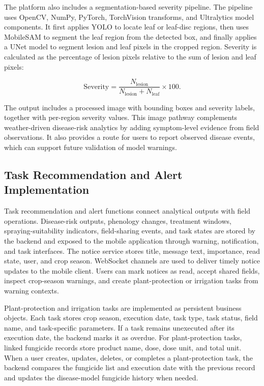 \documentclass[11pt,a4paper]{article}
\begin{document}
The platform also includes a segmentation-based severity pipeline. The pipeline uses OpenCV, NumPy, PyTorch, TorchVision transforms, and Ultralytics model components. It first applies YOLO to locate leaf or leaf-disc regions, then uses MobileSAM to segment the leaf region from the detected box, and finally applies a UNet model to segment lesion and leaf pixels in the cropped region. Severity is calculated as the percentage of lesion pixels relative to the sum of lesion and leaf pixels:

\begin{equation}
\label{eq:severity}
\mathrm{Severity} = \frac{N_{\mathrm{lesion}}}{N_{\mathrm{lesion}} + N_{\mathrm{leaf}}} \times 100.
\end{equation}

The output includes a processed image with bounding boxes and severity labels, together with per-region severity values. This image pathway complements weather-driven disease-risk analytics by adding symptom-level evidence from field observations. It also provides a route for users to report observed disease events, which can support future validation of model warnings.

\subsection{Task Recommendation and Alert Implementation}

Task recommendation and alert functions connect analytical outputs with field operations. Disease-risk outputs, phenology changes, treatment windows, spraying-suitability indicators, field-sharing events, and task states are stored by the backend and exposed to the mobile application through warning, notification, and task interfaces. The notice service stores title, message text, importance, read state, user, and crop season. WebSocket channels are used to deliver timely notice updates to the mobile client. Users can mark notices as read, accept shared fields, inspect crop-season warnings, and create plant-protection or irrigation tasks from warning contexts.

Plant-protection and irrigation tasks are implemented as persistent business objects. Each task stores crop season, execution date, task type, task status, field name, and task-specific parameters. If a task remains unexecuted after its execution date, the backend marks it as overdue. For plant-protection tasks, linked fungicide records store product name, dose, dose unit, and total unit. When a user creates, updates, deletes, or completes a plant-protection task, the backend compares the fungicide list and execution date with the previous record and updates the disease-model fungicide history when needed.
\end{document}
